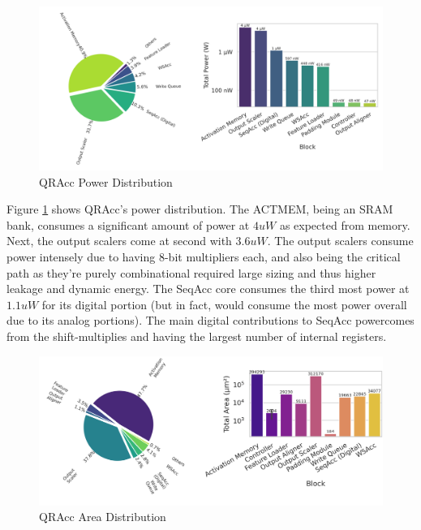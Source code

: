 \begin{figure}[htbp]
    \centering
    \includegraphics[width=\textwidth]{images/qracc/power_results.png}
    \caption{QRAcc Power Distribution}
    \label{fig:qracc_power_distribution}
\end{figure}

Figure \ref{fig:qracc_power_distribution} shows QRAcc's power distribution. The ACTMEM, being an SRAM bank, consumes a significant amount of power at $4uW$ as expected from memory. Next, the output scalers come at second with $3.6uW$. The output scalers consume power intensely due to having 8-bit multipliers each, and also being the critical path as they're purely combinational required large sizing and thus higher leakage and dynamic energy.  The SeqAcc core consumes the third most power at $1.1uW$ for its digital portion (but in fact, would consume the most power overall due to its analog portions). The main digital contributions to SeqAcc powercomes from the shift-multiplies and having the largest number of internal registers. 

\begin{figure}[htbp]
    \centering
    \includegraphics[width=\textwidth]{images/qracc/area_results.png}
    \caption{QRAcc Area Distribution}
    \label{fig:qracc_area_distribution}
\end{figure}

